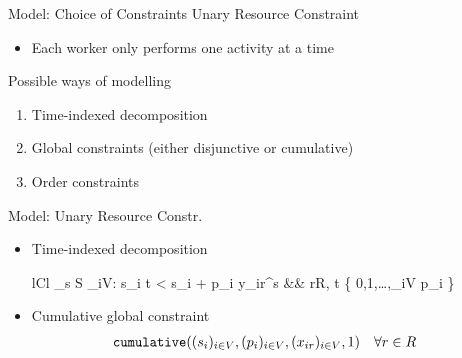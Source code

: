 \documentclass{beamer}
\begin{document}
\begin{frame}{Model: Choice of Constraints}
	Unary Resource Constraint
	\vspace{1mm}
	\begin{itemize}
		\item Each worker only performs one activity at a time\pause
	\end{itemize}
	\vspace{5mm}
	Possible ways of modelling
	\vspace{1mm}
	\begin{enumerate}
		\item Time-indexed decomposition
		\vspace{1mm}
		\item Global constraints (either disjunctive or cumulative)
		\vspace{1mm}
		\item Order constraints
	\end{enumerate}
\end{frame}

\begin{frame}{Model: Unary Resource Constr.}
	\begin{itemize}
		\item Time-indexed decomposition
		\begin{IEEEeqnarray}{lCl}
		    \sum\nolimits_{s \in  S} \sum\nolimits_{i\in V: s_i \leq t < s_i + p_i} y_{ir}^s  
		    &\hspace{2mm}& \forall r\in R, \forall t \in \left\{ 0,1,\ldots,\sum\nolimits_{i\in V} p_i \right\} \nonumber
		\end{IEEEeqnarray}\pause
		\vspace{3mm}
		\item Cumulative global constraint
		\begin{align}
		    & {\tt cumulative}((s_{i})_{i\in V}, (p_{i})_{i\in V}, 
		        (x_{ir})_{i\in V}, 1)
		    && \forall r\in R \nonumber
		\end{align}
	\end{itemize}
\end{frame}
\end{document}
